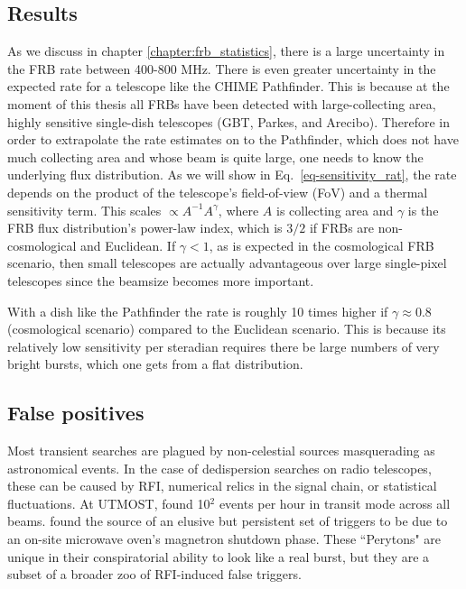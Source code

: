 \subsection{Results}
As we discuss in chapter \ref{chapter:frb_statistics}, there is 
a large uncertainty in the FRB rate between 400-800 MHz. There 
is even greater uncertainty in the expected rate for a 
telescope like the CHIME Pathfinder. This is because at the moment of 
this thesis all FRBs
have been detected with large-collecting area, highly sensitive single-dish 
telescopes (GBT, Parkes, and Arecibo). Therefore in order to 
extrapolate the rate estimates on to the Pathfinder, which 
does not have much collecting area and whose beam is quite large, one 
needs to know the underlying flux distribution. As we will show 
in Eq.~\ref{eq-sensitivity_rat}, the rate depends on the product 
of the telescope's field-of-view (FoV) and a thermal sensitivity term. 
This scales $\propto A^{-1} A^\gamma$, where $A$ is collecting area 
and $\gamma$ is the FRB flux distribution's power-law index, which is 
$3/2$ if FRBs are non-cosmological and Euclidean. If $\gamma < 1$, 
as is expected in the cosmological FRB scenario, then 
small telescopes are actually advantageous over large single-pixel telescopes 
since the beamsize becomes more important. 

With a dish like the Pathfinder
the rate is roughly 10 times higher if $\gamma\approx 0.8$ (cosmological scenario) 
compared to the Euclidean scenario. This is because its relatively 
low sensitivity per steradian requires there be large numbers 
of very bright bursts, which one gets from a flat distribution.

\subsection{False positives}

Most transient searches are plagued by non-celestial sources masquerading 
as astronomical events. In the case of dedispersion searches on 
radio telescopes, these can be caused by RFI, numerical relics 
in the signal chain, or statistical fluctuations. 
At UTMOST, \citet{2016MNRAS.458..718C} found 
10$^2$ events per hour in transit mode across all beams. \citet{2015MNRAS.451.3933P}
found the source of an elusive but persistent set of triggers 
to be due to an on-site microwave oven's magnetron shutdown phase. These 
``Perytons" are unique in their conspiratorial ability to 
look like a real burst, but they are a subset of a broader zoo 
of RFI-induced false triggers. 

